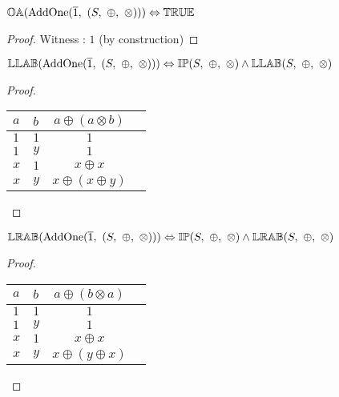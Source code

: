 \begin{theorem} \label{thm:addone_one_annihilates}
$\propname{OA}(\mathrm{AddOne}(\overline{1},\ (S,\ \oplus,\ \otimes))) \Leftrightarrow \propname{TRUE} $
\end{theorem}

\begin{proof}

\vspace{0.5em}
Witness : $1$ (by construction)
\end{proof}



\begin{theorem} \label{thm:addone_left_left_absorptive}
$\propname{LLAB}(\mathrm{AddOne}(\overline{1},\ (S,\ \oplus,\ \otimes))) \Leftrightarrow \propname{IP}(S,\ \oplus,\ \otimes) \wedge \propname{LLAB}(S,\ \oplus,\ \otimes)$
\end{theorem}

\begin{proof}
\begin{center}
\begin{tabular}{llcc}
\toprule
$a$ & $b$ & $a \oplus (a \otimes b)$ \\
\midrule
$1$ & $1$ & $1$ 			\\
$1$ & $y$ & $1$				\\
$x$ & $1$ & $x \oplus x$	\\
$x$ & $y$ & $x \oplus (x \oplus y)$	\\
\bottomrule
\end{tabular}
\end{center}
\end{proof}




\begin{theorem} \label{thm:addone_left_right_absorptive}
$\propname{LRAB}(\mathrm{AddOne}(\overline{1},\ (S,\ \oplus,\ \otimes))) \Leftrightarrow \propname{IP}(S,\ \oplus,\ \otimes) \wedge \propname{LRAB}(S,\ \oplus,\ \otimes)$
\end{theorem}

\begin{proof}
\begin{center}
\begin{tabular}{llcc}
\toprule
$a$ & $b$ & $a \oplus (b \otimes a)$ \\
\midrule
$1$ & $1$ & $1$ 			\\
$1$ & $y$ & $1$				\\
$x$ & $1$ & $x \oplus x$	\\
$x$ & $y$ & $x \oplus (y \oplus x)$	\\
\bottomrule
\end{tabular}
\end{center}
\end{proof}




